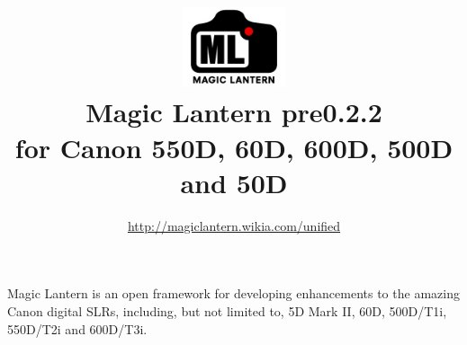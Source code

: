 \documentclass[a4paper,english]{article}
\renewcommand{\href}[2]{\directlua{ShowLink("#1", "#2")}}
\begin{document}
\title{\vspace{-1cm}\includegraphics[width=3cm]{logo-trans.png}\\Magic Lantern pre0.2.2\\{\small for Canon 550D, 60D, 600D, 500D and 50D}}
\author{\url{http://magiclantern.wikia.com/unified}}
\maketitle



Magic Lantern is an open framework for developing enhancements to the amazing Canon digital SLRs, including, but not limited to,
5D Mark II, 60D, 500D/T1i, 550D/T2i and 600D/T3i.
\end{document}
